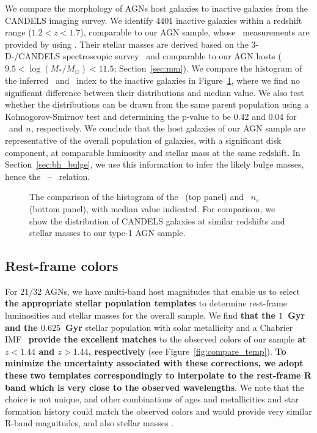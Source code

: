 \documentclass[apj]{emulateapj}
\begin{document}
We compare the morphology of AGNs host galaxies to inactive galaxies from the CANDELS imaging survey. We identify 4401 inactive galaxies within a redshift range ($1.2<z<1.7$), comparable to our AGN sample, whose \sersic\ measurements are provided by \citet{VDwel++2012} using \galfit. Their stellar masses are derived based on the 3-D-\hst/CANDELS spectroscopic survey~\citep{Momcheva2016, Brammer2012} and comparable to our AGN hosts ($9.5< \log (M_* /M_{\odot})< 11.5$; Section~\ref{sec:mm}). We compare the histogram of the inferred \Reff\ and \sersic\ index to the inactive galaxies in Figure~\ref{fig:hist_rn}, where we find no significant difference between their distributions and median value. We also test whether the distributions can be drawn from the same parent population using a Kolmogorov-Smirnov test and determining the p-value to be 0.42 and 0.04 for \Reff\ and $n$, respectively. We conclude that the host galaxies of our AGN sample are representative of the overall population of galaxies, with a significant disk component, at comparable luminosity and stellar mass at the same redshift. In Section~\ref{sec:bh_bulge}, we use this information to infer the likely bulge masses, hence the \mbh\ -- \bmass\ relation.


\begin{figure}[ht]
\caption{\label{fig:hist_rn} 
The comparison of the histogram of the \Reff\ (top panel) and \sersic\ $n_s$ (bottom panel), with median value indicated. For comparison, we show the distribution of CANDELS galaxies at similar redshifts and stellar masses to our type-1 AGN sample.}
\end{figure} 

\subsection{Rest-frame colors}

For $21/32$ AGNs, we have multi-band host magnitudes that enable us to select {\bf the appropriate stellar population templates} to determine rest-frame luminosities and stellar masses for the overall sample.  We find {\bf that the $1$~Gyr and the $0.625$~Gyr} stellar population with solar metallicity and a Chabrier IMF~\citep{Bruzual2003} {\bf provide the excellent matches} to the observed colors of our sample {\bf at $z<1.44$ and $z>1.44$, respectively}  (see Figure~\ref{fig:compare_temp}). {\bf To minimize the uncertainty associated with these corrections, we adopt these two templates correspondingly to interpolate to the rest-frame R band which is very close to the observed wavelengths}. We note that the choice is not unique, and other combinations of ages and metallicities and star formation history could match the observed colors and would provide very similar R-band magnitudes, and also stellar masses \citep{Bell2000, Bell2001}. 
\end{document}
